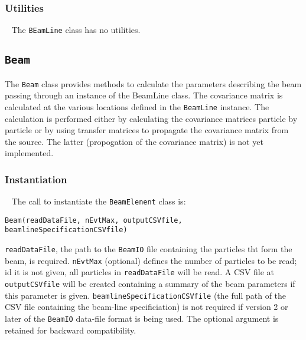 \subsubsection{Utilities} ~\newline
\noindent
The \texttt{BEamLine} class has no utilities.

\FloatBarrier

\subsection{\texttt{Beam}}

The \texttt{Beam} class provides methods to calculate the parameters
describing the beam passing through an instance of the BeamLine class.
The covariance matrix is calculated at the various locations defined
in the \texttt{BeamLine} instance.
The calculation is performed either by calculating the covariance
matrices particle by particle or by using transfer matrices to
propagate the covariance matrix from the source.
The latter (propogation of the covariance matrix) is not yet
implemented.

\subsubsection{Instantiation} ~\newline
\noindent
The call to instantiate the \texttt{BeamElenent} class is:
\begin{center}
  \texttt{Beam(readDataFile, nEvtMax, outputCSVfile, beamlineSpecificationCSVfile)}
\end{center}
\texttt{readDataFile}, the path to the \texttt{BeamIO} file containing
the particles tht form the beam, is required.
\texttt{nEvtMax} (optional) defines the number of particles to be
read; id it is not given, all particles in \texttt{readDataFile} will
be read.
A CSV file at \texttt{outputCSVfile} will be created containing a
summary of the beam parameters if this parameter is given.
\texttt{beamlineSpecificationCSVfile} (the full path of the CSV file
containing the beam-line specificiation) is not required if version 2
or later of the \texttt{BeamIO} data-file format is being used.
The optional argument is retained for backward compatibility.

